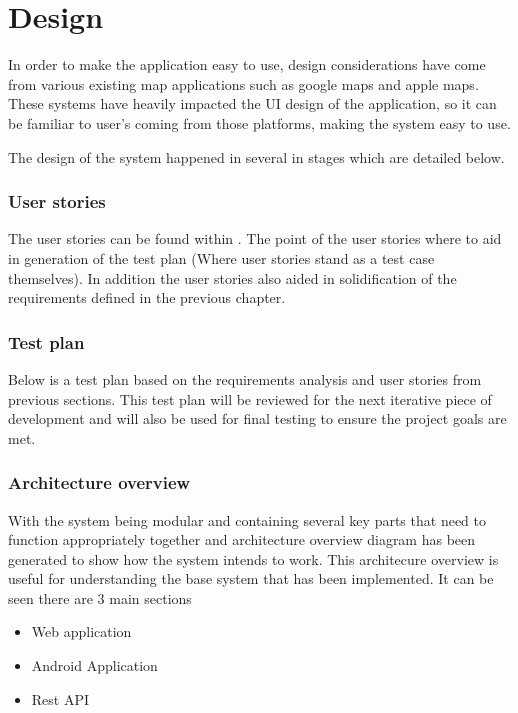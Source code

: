 \section{Design}
In order to make the application easy to use, design considerations have come from various existing map applications such as google maps and apple maps. These systems have heavily impacted the UI design of the application, so it can be familiar to user's coming from those platforms, making the system easy to use.

The design of the system happened in several in stages which are detailed below.

\subsubsection{User stories}
The user stories can be found within \appendixtemp. The point of the user stories where to aid in generation of the test plan (Where user stories stand as a test case themselves). In addition the user stories also aided in solidification of the requirements defined in the previous chapter. 

\subsubsection{Test plan}
Below is a test plan based on the requirements analysis and user stories from previous sections. This test plan will be reviewed for the next iterative piece of development and will also be used for final testing to ensure the project goals are met.

\subsubsection{Architecture overview}
With the system being modular and containing several key parts that need to function appropriately together and architecture overview diagram has been generated to show how the system intends to work. This architecure overview is useful for understanding the base system that has been implemented. It can be seen there are 3 main sections

\begin{itemize}
	\item Web application
	\item Android Application
	\item Rest API
\end{itemize}

